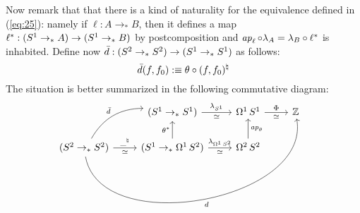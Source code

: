 \documentclass[english,a4]{article}
\newcommand{\Sp}{{S^2}}%
\newcommand{\ptdto}{\to_\ast}%
\def\blank{\_}%
\begin{document}
Now remark that that there is a kind of naturality for the equivalence
defined in (\ref{eq:25}): namely if $\ell:A \ptdto B$, then it defines
a map $\ell^\ast : (\Sc\ptdto A) \to (\Sc \ptdto B)$ by
postcomposition and
$\mathop{{\it ap}_{\ell}} \circ \lambda_A = \lambda_B \circ \ell^\ast$ is
inhabited. Define now $\bar d: (\Sp \ptdto \Sp) \to (\Sc \ptdto \Sc)$
as follows:
\begin{equation}
  \label{eq:29}
  \bar d(f,f_0) \mathrel{\hbox{:}\mkern-5mu\equiv} \theta\circ(f,f_0)^\natural
\end{equation}
The situation is better summarized in the following commutative
diagram:
\begin{equation}
  \label{eq:30}
  \begin{tikzcd}
    {} & (\Sc \ptdto \Sc) \rar["\lambda_{\Sc}","\weq"swap] &
    \loopspace 1 \Sc \rar["\Phi","\weq"swap] & \ZZ
    \\
    (\Sp \ptdto \Sp) \rar["\blank^\natural","\weq"swap] \ar[ur,bend
    left,"\bar d"] \ar[urrr, bend
    right=90,"d"swap] & (\Sc \ptdto \loopspace 1 \Sp)
    \rar["\lambda_{\loopspace 1 \Sp}","\weq"swap] \uar["\theta^\ast"]
    & \loopspace 2 \Sp \uar["\ap\theta"swap] & 
  \end{tikzcd}
\end{equation}
\end{document}
